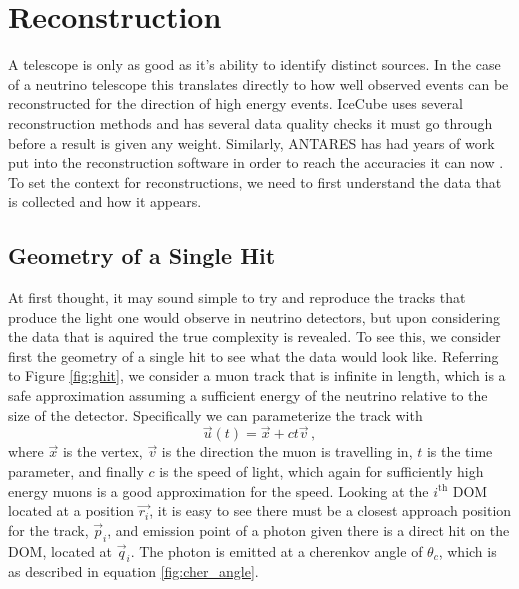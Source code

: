 \chapter{Reconstruction}

A telescope is only as good as it's ability to identify distinct sources. In the case of a neutrino telescope this translates directly to how well observed events can be reconstructed for the direction of high energy events. IceCube uses several reconstruction methods \cite{icecube} and has several data quality checks it must go through before a result is given any weight. Similarly, ANTARES has had years of work put into the reconstruction software in order to reach the accuracies it can now \cite{antares}. To set the context for reconstructions, we need to first understand the data that is collected and how it appears. 

\section{Geometry of a Single Hit}

At first thought, it may sound simple to try and reproduce the tracks that produce the light one would observe in neutrino detectors, but upon considering the data that is aquired the true complexity is revealed. To see this, we consider first the geometry of a single hit to see what the data would look like. Referring to Figure \ref{fig:ghit}, we consider a muon track that is infinite in length, which is a safe approximation assuming a sufficient energy of the neutrino relative to the size of the detector. Specifically we can parameterize the track with
\begin{equation}\label{eq:track}
  \vec{u}(t) = \vec{x} + ct\vec{v}\, ,
\end{equation}
where $\vec{x}$ is the vertex, $\vec{v}$ is the direction the muon is travelling in, $t$ is the time parameter, and finally $c$ is the speed of light, which again for sufficiently high energy muons is a good approximation for the speed. Looking at the $i^{\text{th}}$ DOM located at a position $\vec{r_{i}}$, it is easy to see there must be a closest approach position for the track, $\vec{p}_{i}$, and emission point of a photon given there is a direct hit on the DOM, located at $\vec{q}_{i}$. The photon is emitted at a cherenkov angle of $\theta_{c}$, which is as described in equation \ref{fig:cher_angle}. 


